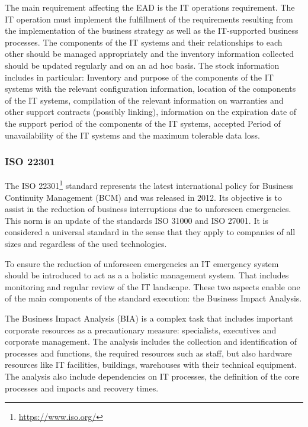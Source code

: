 The main requirement affecting the EAD is the IT operations requirement. The IT operation must implement the fulfillment of the requirements resulting from the implementation of the business strategy as well as the IT-supported business processes. The components of the IT systems and their relationships to each other should be managed appropriately and the inventory information collected should be updated regularly and on an ad hoc basis. The stock information includes in particular: Inventory and purpose of the components of the IT systems with the relevant configuration information, location of the components of the IT systems, compilation of the relevant information on warranties and other support contracts (possibly linking), information on the expiration date of the support period of the components of the IT systems, accepted Period of unavailability of the IT systems and the maximum tolerable data loss. \cite{Anforderungen2018}

\subsubsection{ISO 22301}

The ISO 22301\footnote{\url{https://www.iso.org/}} standard represents the latest international policy for Business Continuity Management (BCM) and was released in 2012. Its objective is to assist in the reduction of business interruptions due to unforeseen emergencies. This norm is an update of the standards ISO 31000 and ISO 27001. It is considered a universal standard in the sense that they apply to companies of all sizes and regardless of the used technologies.

To ensure the reduction of unforeseen emergencies an IT emergency system should be introduced to act as a a holistic management system. That includes monitoring and regular review of the IT landscape. These two aspects enable one of the main components of the standard execution: the Business Impact Analysis. 

The Business Impact Analysis (BIA) is a complex task that includes important corporate resources as a precautionary measure: specialists, executives and corporate management. The analysis includes the collection and identification of processes and functions,
the required resources such as staff, but also hardware resources like IT facilities, buildings, warehouses with their technical equipment. The analysis also include dependencies on IT processes, the definition of the core processes and impacts and recovery times. \cite{Osterhage2016}

